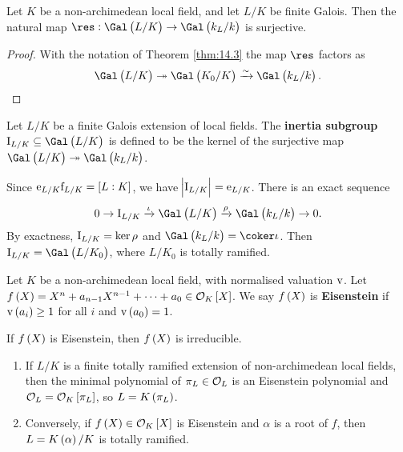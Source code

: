 \pagebreak

\begin{corollary}
Let $ K $ be a non-archimedean local field, and let $ L / K $ be finite Galois. Then the natural map $ \res : \Gal\br{L / K} \to \Gal\br{k_L / k} $ is surjective.
\end{corollary}

\begin{proof}
With the notation of Theorem \ref{thm:14.3} the map $ \res $ factors as
$$ \Gal\br{L / K} \twoheadrightarrow \Gal\br{K_0 / K} \xrightarrow{\sim} \Gal\br{k_L / k}. $$
\end{proof}

\begin{definition}
Let $ L / K $ be a finite Galois extension of local fields. The \textbf{inertia subgroup} $ \I_{L / K} \subseteq \Gal\br{L / K} $ is defined to be the kernel of the surjective map $ \Gal\br{L / K} \twoheadrightarrow \Gal\br{k_L / k} $.
\end{definition}

Since $ \e_{L / K}\f_{L / K} = \sbr{L : K} $, we have $ \abs{\mathrm{I}_{L / K}} = \mathrm{e}_{L / K} $. There is an exact sequence
$$ 0 \to \I_{L / K} \xrightarrow{\iota} \Gal\br{L / K} \xrightarrow{\rho} \Gal\br{k_L / k} \to 0. $$
By exactness, $ \mathrm{I}_{L / K} = \ker \rho $ and $ \Gal\br{k_L / k} = \coker \iota $. Then $ \I_{L / K} = \Gal\br{L / K_0} $, where $ L / K_0 $ is totally ramified.

\begin{definition}
Let $ K $ be a non-archimedean local field, with normalised valuation $ \mathrm{v} $. Let $ f\br{X} = X^n + a_{n - 1}X^{n - 1} + \dots + a_0 \in \OOO_K\sbr{X} $. We say $ f\br{X} $ is \textbf{Eisenstein} if $ \v\br{a_i} \ge 1 $ for all $ i $ and $ \v\br{a_0} = 1 $.
\end{definition}

\begin{fact*}
If $ f\br{X} $ is Eisenstein, then $ f\br{X} $ is irreducible.
\end{fact*}

\begin{theorem}
\label{thm:14.8}
\hfill
\begin{enumerate}
\item If $ L / K $ is a finite totally ramified extension of non-archimedean local fields, then the minimal polynomial of $ \pi_L \in \mathcal{O}_L $ is an Eisenstein polynomial and $ \OOO_L = \OOO_K\sbr{\pi_L} $, so $ L = K\br{\pi_L} $.
\item Conversely, if $ f\br{X} \in \OOO_K\sbr{X} $ is Eisenstein and $ \alpha $ is a root of $ f $, then $ L = K\br{\alpha} / K $ is totally ramified.
\end{enumerate}
\end{theorem}

